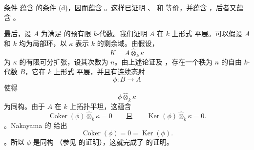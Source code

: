 条件 \textup{} 蕴含  的条件 \textup{(d)}，因而蕴含 \textup{}。这样已证明 \textup{}、\textup{} 和 \textup{} 等价，并蕴含 \textup{}，后者又蕴含 \textup{}。

最后，设 \(A\) 为满足 \textup{} 的预有限 \(k\)-代数。我们证明 \(A\) 在 \(k\) 上形式 平展。可以假设 \(A\) 和 \(k\) 均为局部环，以 \(\kappa\) 表示 \(k\) 的剩余域。由假设，\[
  K=A\widehat\otimes_k\kappa
\] 为 \(\kappa\) 的有限可分扩张，设其次数为 \(n\)。由上述论证及 ，存在一个秩为 \(n\) 的自由 \(k\)-代数 \(B\)，它在 \(k\) 上形式 平展，并且有连续态射 \[
  \phi:B\longrightarrow A
\] 使得 \[
  \phi\widehat\otimes_k\kappa
\] 为同构。由于 \(A\) 在 \(k\) 上拓扑平坦，这蕴含 \[
  \operatorname{Coker}(\phi)\widehat\otimes_k\kappa=0
  \qquad\text{且}\qquad
  \operatorname{Ker}(\phi)\widehat\otimes_k\kappa=0.
\]。Nakayama 的  给出 \[
  \operatorname{Coker}(\phi)=0
  =
  \operatorname{Ker}(\phi).
\]。所以 \(\phi\) 是同构 \textup{（参见  的证明）}，这就完成了  的证明。
